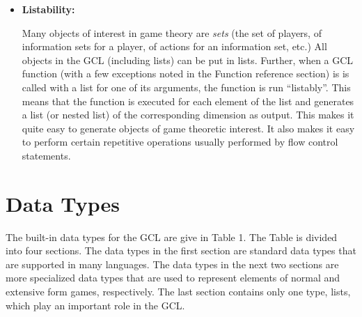 \begin{itemize}
\item {\bf Listability: } 

Many objects of interest in game theory are {\it sets} (the set of
players, of information sets for a player, of actions for an
information set, etc.)  All objects in the GCL (including lists) can
be put in lists.  Further, when a GCL function (with a few exceptions
noted in the Function reference section) is is called with a list for
one of its arguments, the function is run ``listably''.  This means
that the function is executed for each element of the list and
generates a list (or nested list) of the corresponding dimension as
output.  This makes it quite easy to generate objects of game
theoretic interest.  It also makes it easy to perform certain
repetitive operations usually performed by flow control statements.
\end{itemize}

\section{Data Types}

The built-in data types for the GCL are give in Table 1.  The Table is
divided into four sections. The data types in the first section are
standard data types that are supported in many languages.  The data
types in the next two sections are more specialized data types that
are used to represent elements of normal and extensive form games,
respectively.  The last section contains only one type, lists, which
play an important role in the GCL.

\medskip

